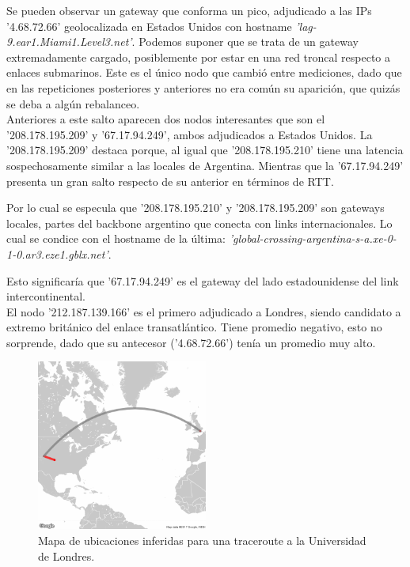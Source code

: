 Se pueden observar un gateway que conforma un pico, adjudicado a las IPs '4.68.72.66' geolocalizada en Estados Unidos con hostname \emph{'lag-9.ear1.Miami1.Level3.net'}. Podemos suponer que se trata de un gateway extremadamente cargado, posiblemente por estar en una red troncal respecto a enlaces submarinos. Este es el único nodo que cambió entre mediciones, dado que en las repeticiones posteriores y anteriores no era común su aparición, que quizás se deba a algún rebalanceo. \\


Anteriores a este salto aparecen dos nodos interesantes que son el '208.178.195.209' y '67.17.94.249', ambos adjudicados a Estados Unidos.
La '208.178.195.209' destaca porque, al igual que '208.178.195.210' tiene una latencia sospechosamente similar a las locales de Argentina. Mientras que la '67.17.94.249' presenta un gran salto respecto de su anterior en términos de RTT.

Por lo cual se especula que '208.178.195.210' y '208.178.195.209' son gateways locales, partes del backbone argentino que conecta con links internacionales. Lo cual se condice con el hostname de la última: \emph{'global-crossing-argentina-s-a.xe-0-1-0.ar3.eze1.gblx.net'}.

Esto significaría que '67.17.94.249' es el gateway del lado estadounidense del link intercontinental. \\

El nodo '212.187.139.166' es el primero adjudicado a Londres, siendo candidato a extremo británico del enlace transatlántico. Tiene promedio negativo, esto no sorprende, dado que su antecesor ('4.68.72.66') tenía un promedio muy alto.

\begin{figure}[H]
   \centering
       \includegraphics[width=0.5\textwidth, keepaspectratio]{../img/lan-map}
 \caption{Mapa de ubicaciones inferidas para una traceroute a la Universidad de Londres.}
 \label{fig:lan-map}
\end{figure}

